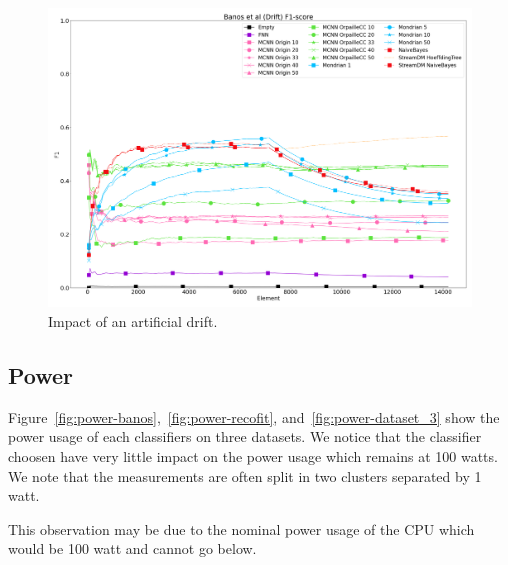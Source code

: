 \begin{figure}[H]
	\includegraphics[width=\linewidth]{figures/results/drift_f1.png}
	\caption{Impact of an artificial drift.}
	\label{fig:f1-drift}
\end{figure}

\subsection{Power}
Figure~\ref{fig:power-banos},~\ref{fig:power-recofit}, and~\ref{fig:power-dataset_3} show the power usage of each classifiers on three
datasets. We notice that the classifier choosen have very little impact on the
power usage which remains at 100 watts. We note that the measurements are often
split in two clusters separated by 1 watt.

This observation may be due to the nominal power usage of the CPU which would
be 100 watt and cannot go below.

